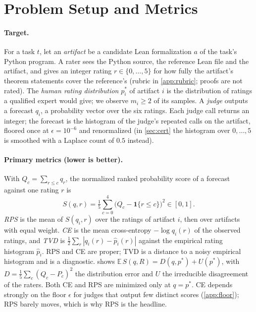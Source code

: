 \section{Problem Setup and Metrics}
\label{sec:setup}
\paragraph{Target.}
For a task $t$, let an \emph{artifact} be a candidate Lean formalization $a$ of the task's Python program.
A rater sees the Python source, the reference Lean file and the artifact, and gives an integer rating $r\in\{0,\dots,5\}$ for how fully the artifact's theorem statements cover the reference's (rubric in \cref{app:rubric}; proofs are not rated).
The \emph{human rating distribution} $p^*_i$ of artifact $i$ is the distribution of ratings a qualified expert would give; we observe $m_i\ge 2$ of its samples.
A \emph{judge} outputs a forecast $q_i$, a probability vector over the six ratings.
Each judge call returns an integer; the forecast is the histogram of the judge's repeated calls on the artifact, floored once at $\epsilon=10^{-6}$ and renormalized (in \cref{sec:cert} the histogram over $0,\dots,5$ is smoothed with a Laplace count of $0.5$ instead).

\paragraph{Primary metrics (lower is better).}
With $Q_c=\sum_{r\le c}q_r$, the normalized ranked probability score of a forecast against one rating $r$ is
\begin{equation}
  S(q,r)=\tfrac15\sum_{c=0}^{4}\bigl(Q_c-\mathbf 1\{r\le c\}\bigr)^2\in[0,1].
\end{equation}
\emph{RPS} is the mean of $S(q_i,r)$ over the ratings of artifact $i$, then over artifacts with equal weight.
\emph{CE} is the mean cross-entropy $-\log q_i(r)$ of the observed ratings, and \emph{TVD} is $\tfrac12\sum_r|q_i(r)-\hat p_i(r)|$ against the empirical rating histogram $\hat p_i$.
RPS and CE are proper; TVD is a distance to a noisy empirical histogram and is a diagnostic.
 shows $\mathbb E\,S(q,R)=D(q,p^*)+U(p^*)$, with $D=\tfrac15\sum_c (Q_c-P_c)^2$ the distribution error and $U$ the irreducible disagreement of the raters.
Both CE and RPS are minimized only at $q=p^*$.
CE depends strongly on the floor $\epsilon$ for judges that output few distinct scores (\cref{app:floor}); RPS barely moves, which is why RPS is the headline.

